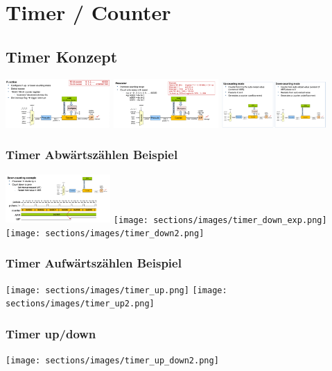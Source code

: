 \section{Timer / Counter}
\subsection{Timer Konzept}
\includegraphics[width=0.3\textwidth]{sections/images/timer_func.png}
\includegraphics[width=0.3\textwidth]{sections/images/timer_prescaler.png}
\includegraphics[width=0.3\textwidth]{sections/images/timer_up_down.png}

\subsubsection{Timer Abwärtszählen Beispiel}
\includegraphics[width=0.3\textwidth]{sections/images/timer_down.png}
\texttt{[image: sections/images/timer\_down\_exp.png]}
\texttt{[image: sections/images/timer\_down2.png]}

\subsubsection{Timer Aufwärtszählen Beispiel}
\texttt{[image: sections/images/timer\_up.png]}
\texttt{[image: sections/images/timer\_up2.png]}

\subsubsection{Timer up/down}
\texttt{[image: sections/images/timer\_up\_down2.png]}


